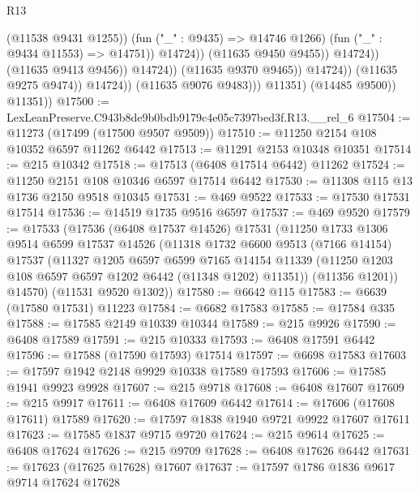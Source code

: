 \begin{lexlean}{R13}
\begin{coremodule}
                                                (@11538 @9431 @1255))
                                              (fun ("_" : @9435) => @14746 @1266)
                                              (fun ("_" : @9434 @11553) => @14751))
                                            @14724))
                                        (@11635 @9450 @9455))
                                      @14724))
                                  (@11635 @9413 @9456))
                                @14724))
                            (@11635 @9370 @9465))
                          @14724))
                      (@11635 @9275 @9474))
                    @14724))
                (@11635 @9076 @9483)))
            @11351)
          (@14485 @9500))
        @11351))
@17500 := LexLeanPreserve.C943b8de9b0bdb9179c4e05c7397bed3f.R13.__rel_6
@17504 := @11273 (@17499 (@17500 @9507 @9509))
@17510 := @11250 @2154 @108 @10352 @6597 @11262 @6442
@17513 := @11291 @2153 @10348 @10351
@17514 := @215 @10342
@17518 := @17513 (@6408 @17514 @6442) @11262
@17524 := @11250 @2151 @108 @10346 @6597 @17514 @6442
@17530 := @11308 @115 @13 @1736 @2150 @9518 @10345
@17531 := @469 @9522
@17533 := @17530 @17531 @17514
@17536 := @14519 @1735 @9516 @6597
@17537 := @469 @9520
@17579 := @17533
    (@17536
      (@6408 @17537 @14526)
      @17531
      (@11250
        @1733
        @1306
        @9514
        @6599
        @17537
        @14526
        (@11318
          @1732
          @6600
          @9513
          (@7166 @14154)
          @17537
          (@11327
            @1205
            @6597
            @6599
            @7165
            @14154
            @11339
            (@11250 @1203 @108 @6597 @6597 @1202 @6442 (@11348 @1202) @11351))
          (@11356 @1201))
        @14570)
      (@11531 @9520 @1302))
@17580 := @6642 @115
@17583 := @6639 (@17580 @17531) @11223
@17584 := @6682 @17583
@17585 := @17584 @335
@17588 := @17585 @2149 @10339 @10344
@17589 := @215 @9926
@17590 := @6408 @17589
@17591 := @215 @10333
@17593 := @6408 @17591 @6442
@17596 := @17588 (@17590 @17593) @17514
@17597 := @6698 @17583
@17603 := @17597 @1942 @2148 @9929 @10338 @17589 @17593
@17606 := @17585 @1941 @9923 @9928
@17607 := @215 @9718
@17608 := @6408 @17607
@17609 := @215 @9917
@17611 := @6408 @17609 @6442
@17614 := @17606 (@17608 @17611) @17589
@17620 := @17597 @1838 @1940 @9721 @9922 @17607 @17611
@17623 := @17585 @1837 @9715 @9720
@17624 := @215 @9614
@17625 := @6408 @17624
@17626 := @215 @9709
@17628 := @6408 @17626 @6442
@17631 := @17623 (@17625 @17628) @17607
@17637 := @17597 @1786 @1836 @9617 @9714 @17624 @17628

\end{coremodule}
\end{lexlean}
